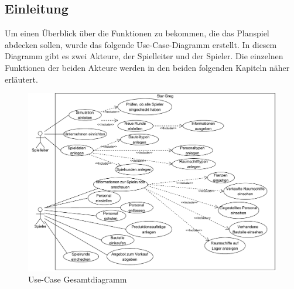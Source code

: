 \subsection{Einleitung}
\label{sec:fachkonzept-usecase-einleitung}

Um einen Überblick über die Funktionen zu bekommen, die das Planspiel abdecken sollen, wurde das folgende Use-Case-Diagramm erstellt. In diesem Diagramm gibt es zwei Akteure, der Spielleiter und der Spieler. Die einzelnen Funktionen der beiden Akteure werden in den beiden folgenden Kapiteln näher erläutert.

\begin{figure}[h]
  \centering
    \includegraphics[width=\textwidth]{30_Fachkonzept/10_UseCase/10_Einleitung/diagramm}
  \caption{Use-Case Gesamtdiagramm}
  \label{img:fachkonzept-usecase-einleitung-diagramm}
\end{figure}